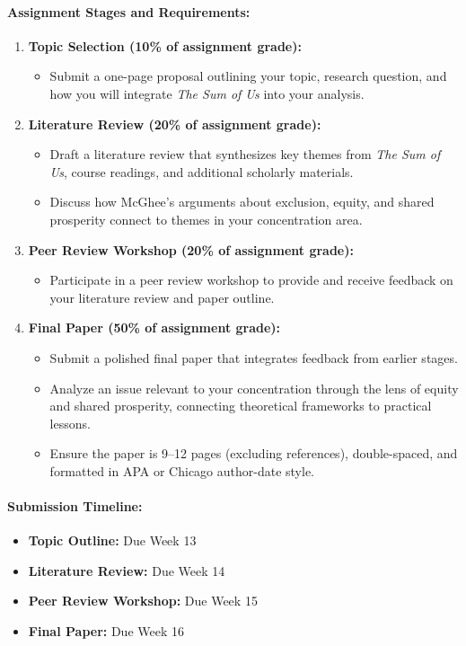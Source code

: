 \documentclass[12pt, letterpaper]{article}
\begin{document}
\paragraph*{Assignment Stages and Requirements:}
\begin{enumerate}
    \item \textbf{Topic Selection (10\% of assignment grade):}
    \begin{itemize}
        \item Submit a one-page proposal outlining your topic, research question, and how you will integrate \textit{The Sum of Us} into your analysis.
    \end{itemize}
    \item \textbf{Literature Review (20\% of assignment grade):}
    \begin{itemize}
        \item Draft a literature review that synthesizes key themes from \textit{The Sum of Us}, course readings, and additional scholarly materials.
        \item Discuss how McGhee's arguments about exclusion, equity, and shared prosperity connect to themes in your concentration area.
    \end{itemize}
    \item \textbf{Peer Review Workshop (20\% of assignment grade):}
    \begin{itemize}
        \item Participate in a peer review workshop to provide and receive feedback on your literature review and paper outline.
    \end{itemize}
    \item \textbf{Final Paper (50\% of assignment grade):}
    \begin{itemize}
        \item Submit a polished final paper that integrates feedback from earlier stages.
        \item Analyze an issue relevant to your concentration through the lens of equity and shared prosperity, connecting theoretical frameworks to practical lessons.
        \item Ensure the paper is 9--12 pages (excluding references), double-spaced, and formatted in APA or Chicago author-date style.
    \end{itemize}
\end{enumerate}

\paragraph*{Submission Timeline:}
\begin{itemize}
    \item \textbf{Topic Outline:} Due Week 13
    \item \textbf{Literature Review:} Due Week 14
    \item \textbf{Peer Review Workshop:} Due Week 15
    \item \textbf{Final Paper:} Due Week 16
\end{itemize}
\end{document}
